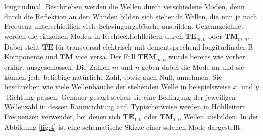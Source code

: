 longitudinal. Beschrieben werden die Wellen durch verschiedene Moden, denn durch die Reflektion an den Wänden bilden sich stehende Wellen, die nun je nach Frequenz unterschiedlich viele Schwingungsbäuche ausbilden. 
Gekennzeichnet werden die einzelnen Moden in Rechteckhohlleitern durch $\textbf{TE}_{m,n}$ oder $\textbf{TM}_{m,n}$. Dabei steht $\textbf{TE}$ für transversal elektrisch mit dementsprechend longitudinaler B-Komponente und $\textbf{TM}$ vice versa. Der Fall $\textbf{TEM}_{m,n}$ wurde
bereits wie vorher erklärt ausgeschlossen. Die Zahlen $m$ und $n$ geben dabei die Mode an und sie können jede beliebige natürliche Zahl, sowie auch Null, annehmen. Sie beschreiben wie viele Wellenbäuche der stehenden Welle in beispielsweise $x$, und $y$-Richtung passen.
Genauer gesagt stellen sie eine Bedingung der jeweiligen Wellenzahl in dessen Raumrichtung auf. Typischerweise werden in Hohlleitern Frequenzen verwendet, bei denen sich $\textbf{TE}_{1,0}$ oder $\textbf{TM}_{1,0}$ Wellen ausbilden. In der Abbildung \ref{fig:4} ist eine 
schematische Skizze einer solchen Mode dargestellt.

